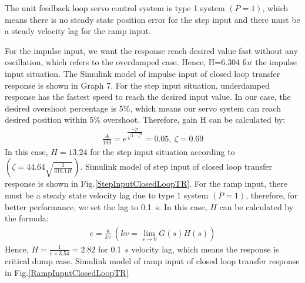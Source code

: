\documentclass[conference]{IEEEtran}
\begin{document}
The unit feedback loop servo control system is type 1 system $(P=1)$, which means there is no steady state position error for the step input and there must be a steady velocity lag for the ramp input.

For the impulse input, we want the response reach desired value fast without any oscillation, which refers to the overdamped case. Hence, H=6.304 for the impulse input situation. The Simulink model of impulse input of closed loop transfer response is shown in Graph 7.
For the step input situation, underdamped response has the fastest speed to reach the desired input value. In our case, the desired overshoot percentage is 5\%, which means our servo system can reach desired position within 5\% overshoot. Therefore, gain H can be calculated by:
\begin{align}
    \frac{A}{100} = e^{\frac{-\zeta \pi}{\sqrt{1-\zeta^2}}} = 0.05, \ \zeta = 0.69
\end{align}
In this case, $H = 13.24$ for the step input situation according to $(\zeta = 44.64 \sqrt{\frac{1}{316.1H}})$. Simulink model of step input of closed loop transfer response is shown in Fig.\ref{StepInputClosedLoopTR}. For the ramp input, there must be a steady state velocity lag due to type 1 system $(P=1)$, therefore, for better performance, we set the lag to \SI{0.1}{\second}. In this case, $H$ can be calculated by the formula:
\begin{align}
    e = \frac{a}{kv} \ (kv = \lim_{s \rightarrow 0} G(s) H(s))
\end{align}
Hence, $H=\frac{1}{e \times 3.54} = 2.82$ for \SI{0.1}{\second} velocity lag, which means the response is critical dump case. Simulink model of ramp input of closed loop transfer response in Fig.\ref{RampInputClosedLoopTR}
\end{document}
